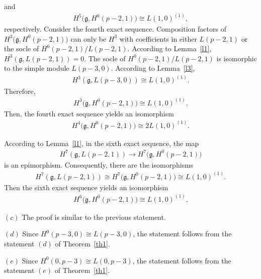 \documentclass[pdftex]{sigma}%
\numberwithin{equation}{section}
\begin{document}
and
\begin{gather*}
H^5\big(\mathfrak{g},H^0(p-2,1)\big)\cong L(1,0)^{(1)},
\end{gather*}
respectively.
Consider the fourth exact sequence. Composition factors of $H^3\big(\mathfrak{g},H^0(p-2,1)\big)$ can only be $H^3$ with coefficients in either $L(p-2,1)$ or the socle of $H^0(p-2,1)/L(p-2,1)$.
According to Lemma~\ref{l1}, $H^3(\mathfrak{g},L(p-2,1))=0$. The socle of $H^0(p-2,1)/L(p-2,1)$ is isomorphic to the simple module $L(p-3,0)$. According to Lemma~\ref{l3},
\begin{gather*}
H^3(\mathfrak{g},L(p-3,0))\cong L(1,0)^{(1)}.
\end{gather*}
Therefore,
\begin{gather*}
H^3\big(\mathfrak{g},H^0(p-2,1)\big)\cong L(1,0)^{(1)}.
\end{gather*}
Then, the fourth exact sequence yields an isomorphism
\begin{gather*}
H^4\big(\mathfrak{g},H^0(p-2,1)\big)\cong 2L(1,0)^{(1)}.
\end{gather*}

According to Lemma~\ref{l1}, in the sixth exact sequence, the map
\begin{gather*}
H^7(\mathfrak{g},L(p-2,1))\longrightarrow
H^7\big(\mathfrak{g},H^0(p-2,1)\big)
\end{gather*}
is an epimorphism. Consequently, there are the isomorphisms
\begin{gather*}
H^7(\mathfrak{g},L(p-2,1))\cong
H^7\big(\mathfrak{g},H^0(p-2,1)\big)\cong L(1,0)^{(1)}.
\end{gather*}
Then the sixth exact sequence yields an isomorphism
\begin{gather*}
H^6\big(\mathfrak{g},H^0(p-2,1)\big)\cong L(1,0)^{(1)}.
\end{gather*}

$(c)$ The proof is similar to the previous statement.

$(d)$ Since $H^0(p-3,0)\cong L(p-3,0)$, the statement follows from the statement $(d)$ of Theorem~\ref{th1}.

$(e)$ Since $H^0(0,p-3)\cong L(0,p-3)$, the statement follows from the statement $(e)$ of Theorem~\ref{th1}.
\end{document}
